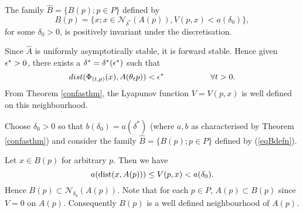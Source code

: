 \begin{lemma}[B1]
The family $\hat{B} = \{B(p); p \in P \}$ defined by
\begin{equation}\label{eqBdefn}
 B(p) = \{ x; x \in \mathcal{N}_{\delta^*}(A(p)), V(p, x) < a (\delta_0 )
        \},
\end{equation}
for some $\delta_0 > 0$, is positively invariant under the discretisation.
\end{lemma}
\begin{prf}
Since $\hat{A}$ is uniformly asymptotically stable, it is forward stable. Hence
given $\epsilon^*>0$, there exists a $\delta^* = \delta^*(\epsilon^*)$ such that
\[ dist( \Phi_{(t,p)}(x), A(\theta_{t}p)) < \epsilon^* \hspace{2cm} \forall t>0. \]
From Theorem \ref{confasthm}, the Lyapunov function $V = V(p, x)$ is well
defined on this neighbourhood.

Choose $\delta_0 > 0$ so that $b(\delta_0) = a( \delta^*)$ (where $a, b$ as
characterised by Theorem \ref{confasthm}) and consider the family $\hat{B} = \{
B(p) ; p \in P \}$ defined by (\ref{eqBdefn}).

Let $x \in B(p)$ for arbitrary $p$. Then we have
\[ a( {\rm dist}(x, A(p)) ) \leq V( p, x ) < a( \delta_0 ). \]
Hence $B(p) \subset \mathcal{N}_{\delta_0}(A(p))$.
Note that for each $p \in P$, $A(p) \subset B(p)$ since $V = 0$
on $A(p)$. Consequently $B(p)$ is a well defined neighbourhood of $A(p)$.


\end{prf}
